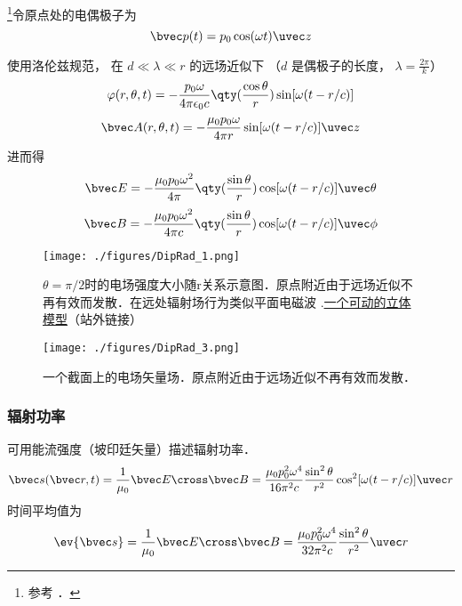 
\begin{issues}
\issueDraft
\end{issues}


\footnote{参考 \cite{GriffE}．}令原点处的电偶极子为
\begin{equation}
\bvec p(t) = p_0 \cos(\omega t) \uvec z
\end{equation}

使用洛伦兹规范， 在 $d \ll \lambda \ll r$ 的远场近似下 （$d$ 是偶极子的长度， $\lambda = \frac{2\pi}{k}$）
\begin{equation}
\varphi(r, \theta, t) = -\frac{p_0\omega}{4\pi\epsilon_0 c} \qty(\frac{\cos\theta}{r}) \sin[\omega(t - r/c)]
\end{equation}
\begin{equation}
\bvec A(r, \theta, t) = -\frac{\mu_0 p_0 \omega}{4\pi r} \sin[\omega(t - r/c)]\uvec z
\end{equation}
进而得
\begin{equation}
\bvec E = -\frac{\mu_0 p_0\omega^2}{4\pi} \qty(\frac{\sin\theta}{r})\cos[\omega(t - r/c)]\uvec \theta
\end{equation}
\begin{equation}
\bvec B = -\frac{\mu_0 p_0\omega^2}{4\pi c} \qty(\frac{\sin\theta}{r})\cos[\omega(t - r/c)]\uvec \phi
\end{equation}

\begin{figure}[ht]
\centering
\texttt{[image: ./figures/DipRad\_1.png]}
\caption{$\theta = \pi/2$时的电场强度大小随r关系示意图．原点附近由于远场近似不再有效而发散．在远处辐射场行为类似平面电磁波 .\href{https://www.geogebra.org/m/xnputtwr}{一个可动的立体模型}（站外链接）} \label{DipRad_fig1}
\end{figure}

\begin{figure}[ht]
\centering
\texttt{[image: ./figures/DipRad\_3.png]}
\caption{一个截面上的电场矢量场．原点附近由于远场近似不再有效而发散．} \label{DipRad_fig3}
\end{figure}

\subsubsection{辐射功率}
可用能流强度（坡印廷矢量）描述辐射功率．
\begin{equation}
\bvec s(\bvec r, t) = \frac{1}{\mu_0} \bvec E \cross \bvec B = \frac{\mu_0p_0^2\omega^4}{16\pi^2c} \frac{\sin^2\theta}{r^2} \cos^2[\omega(t - r/c)] \uvec r
\end{equation}
时间平均值为
\begin{equation}
\ev{\bvec s} = \frac{1}{\mu_0} \bvec E \cross \bvec B
= \frac{\mu_0p_0^2\omega^4}{32\pi^2c} \frac{\sin^2\theta}{r^2} \uvec r
\end{equation}

